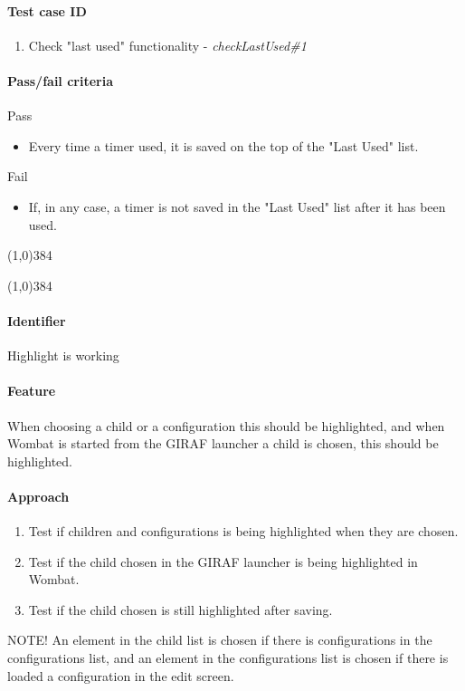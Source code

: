 \paragraph{Test case ID}
	\begin{enumerate}
		\item Check "last used" functionality - \textit{checkLastUsed\#1}
	\end{enumerate}
\paragraph{Pass/fail criteria}
	Pass
	\begin{itemize}
		\item Every time a timer used, it is saved on the top of the "Last Used" list.
	\end{itemize}
	Fail
	\begin{itemize}
		\item If, in any case, a timer is not saved in the "Last Used" list after it has been used.
	\end{itemize}
\begin{center}
	\line(1,0){384}
\end{center}

\pagebreak
\begin{center}
	\line(1,0){384}
\end{center}
\paragraph{Identifier}
	Highlight is working
\paragraph{Feature}
	When choosing a child or a configuration this should be highlighted, and when Wombat is started from the GIRAF launcher a child is chosen, this should be highlighted.
\paragraph{Approach}
	\begin{enumerate} 
		\item Test if children and configurations is being highlighted when they are chosen.
		\item Test if the child chosen in the GIRAF launcher is being highlighted in Wombat.
		\item Test if the child chosen is still highlighted after saving.
	\end{enumerate}
	NOTE! An element in the child list is chosen if there is configurations in the configurations list, and an element in the configurations list is chosen if there is loaded a configuration in the edit screen.
